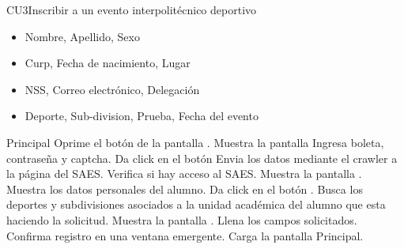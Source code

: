 \begin{UseCase}{CU3}{Inscribir a un evento interpolitécnico deportivo}
{\begin{itemize}
        	\item Nombre, Apellido, Sexo
        	\item Curp, Fecha de nacimiento, Lugar
        	\item NSS, Correo electrónico, Delegación
        	\item Deporte, Sub-division, Prueba, Fecha del evento
        \end{itemize}}
		\end{UseCase}
    \begin{UCtrayectoria}{Principal}
    \UCpaso[\UCactor] Oprime el botón  de la pantalla .\label{CU3_inicio}
    \UCpaso Muestra la pantalla \label{CU3_regresa}
    \UCpaso[\UCactor] Ingresa boleta, contraseña y captcha.
    \UCpaso[\UCactor] Da click en el botón 
    \UCpaso Envia los datos mediante el crawler a la página del SAES.
    \UCpaso Verifica si hay acceso al SAES.  
    \UCpaso Muestra la pantalla .
    \UCpaso Muestra los datos personales del alumno.
	\UCpaso[\UCactor] Da click en el botón . 
	\UCpaso Busca los deportes y subdivisiones asociados a la unidad académica del alumno que esta haciendo la solicitud.
	\UCpaso Muestra la pantalla . \label{CU3_deporte}
	\UCpaso[\UCactor] Llena los campos solicitados. 
    \UCpaso Confirma registro en una ventana emergente.
    \UCpaso Carga la pantalla Principal.
    \end{UCtrayectoria}
    
